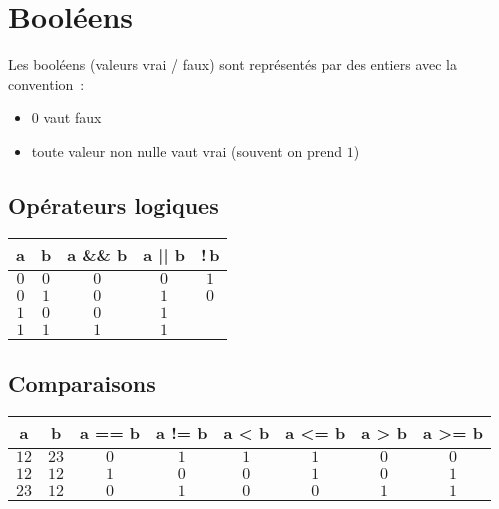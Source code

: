 \documentclass[a4paper,10pt]{article}
\begin{document}
  \section{Booléens}
  Les booléens (valeurs vrai / faux) sont représentés par des entiers avec la convention~:
  \begin{itemize}
    \item $0$ vaut faux
    \item toute valeur non nulle vaut vrai (souvent on prend $1$)
  \end{itemize}
  
  \subsection{Opérateurs logiques}
  \begin{tabu}{cc|c|c|c}
    a & b & a \&\& b & a || b & !\,b\\
    \hline
    $0$ & $0$ & $0$ & $0$ & $1$\\
    $0$ & $1$ & $0$ & $1$ & $0$\\
    $1$ & $0$ & $0$ & $1$ &\\
    $1$ & $1$ & $1$ & $1$ &\\
  \end{tabu}
  
  \subsection{Comparaisons}
  \begin{tabu}{cc|cc|cc|cc}
    a & b & a == b & a != b & a < b & a <= b & a > b & a >= b\\
    \hline
    $12$ & $23$ & $0$ & $1$ & $1$ & $1$ & $0$ & $0$\\
    $12$ & $12$ & $1$ & $0$ & $0$ & $1$ & $0$ & $1$\\
    $23$ & $12$ & $0$ & $1$ & $0$ & $0$ & $1$ & $1$\\
  \end{tabu}
\end{document}
